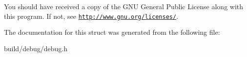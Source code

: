 You should have received a copy of the G\-N\-U General Public License along with this program. If not, see \href{http://www.gnu.org/licenses/}{\tt http\-://www.\-gnu.\-org/licenses/}. 

The documentation for this struct was generated from the following file\-:\begin{DoxyCompactItemize}
\item 
build/debug/debug.\-h\end{DoxyCompactItemize}
